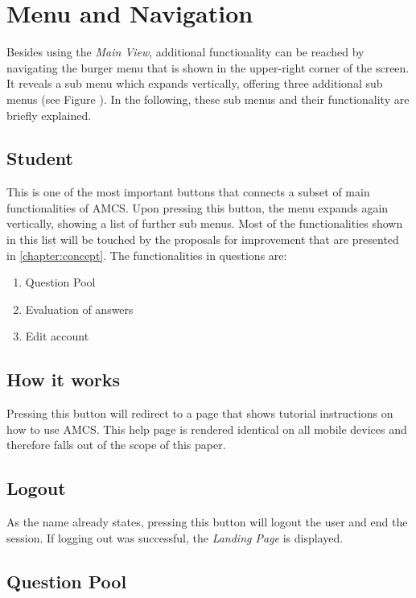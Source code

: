 \section{Menu and Navigation}
Besides using the \emph{Main View}, additional functionality can be reached by navigating the burger menu that is shown in the upper-right corner of the screen. It reveals a sub menu which expands vertically, offering three additional sub menus (see Figure \todosct). In the following, these sub menus and their functionality are briefly explained.

\subsection{Student}

This is one of the most important buttons that connects a subset of main functionalities of AMCS. Upon pressing this button, the menu expands again vertically, showing a list of further sub menus. Most of the functionalities shown in this list will be touched by the proposals for improvement that are presented in \autoref{chapter:concept}. The functionalities in questions are:

\begin{enumerate}
	\item Question Pool
	\item Evaluation of answers
	\item Edit account
\end{enumerate}


\subsection{How it works}

Pressing this button will redirect to a page that shows tutorial instructions on how to use AMCS.
This help page is rendered identical on all mobile devices and therefore falls out of the scope of this paper.

\subsection{Logout}

As the name already states, pressing this button will logout the user and end the session. 
If logging out was successful, the \emph{Landing Page} is displayed.

\subsection{Question Pool}

